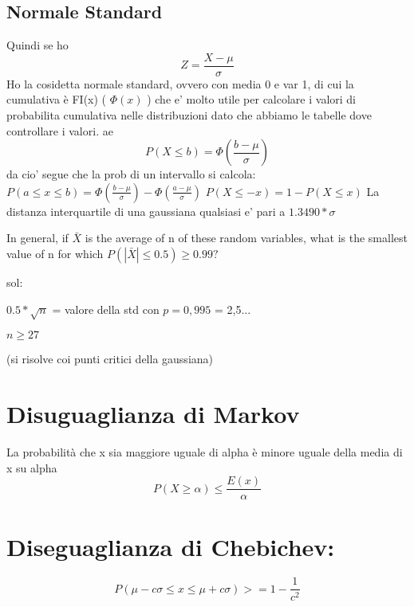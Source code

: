 \documentclass{book}
\begin{document}
\subsection{Normale Standard}
Quindi se ho
\begin{equation}
Z= \frac{X-\mu}{\sigma}
\end{equation}
Ho la cosidetta normale standard, ovvero con media 0 e var 1, di cui la cumulativa è
FI(x) ( $\Phi(x)$ ) che e' molto utile per calcolare i valori di probabilita cumulativa nelle distribuzioni
dato che abbiamo le tabelle dove controllare i valori.
ae 
\begin{equation}
	P(X \le b) = \Phi (\frac{b-\mu}{\sigma})
\end{equation}
da cio' segue che la prob di un intervallo si calcola:
\newline
$P(a \le x \le b) = \Phi (\frac{b-\mu}{\sigma})-\Phi (\frac{a-\mu}{\sigma})$
\newline
\newline
$P(X \le -x) = 1-P(X \le x)$
\newline
\newline
La distanza interquartile di una gaussiana qualsiasi e' pari a $1.3490*\sigma$
\newline
\newline

In general, if $\bar{X}$ is the average of n of these random
variables, what is the smallest value of n for which
$P(| \bar{X} | ≤ 0.5) ≥ 0.99?$

sol:

$0.5*\sqrt{n}$ = valore della std con $p= 0,995$ = 2,5...

$n \ge 27$

(si risolve coi punti critici della gaussiana)
\section{Disuguaglianza di Markov}
La probabilità che x sia maggiore uguale di alpha è minore uguale della media di x su alpha
\begin{equation}
	P(X\ge\alpha) \le \frac{E(x)}{\alpha}
\end{equation}

\section{Diseguaglianza di Chebichev:}
\begin{equation}
	P( \mu-c\sigma \le x \le \mu + c\sigma) >= 1 - \frac{1}{c^2}
\end{equation}
\end{document}
